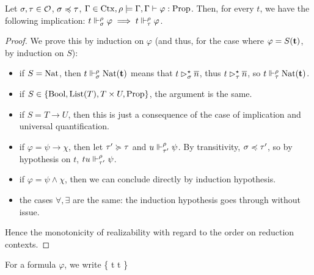 \documentclass[a4paper,UKenglish,cleveref, autoref, thm-restate]{lipics-v2021}
\begin{document}
\begin{proposition}\label{prop.monotonicity}
  Let $\sigma, \tau \in \mathcal O$, $\sigma \preccurlyeq \tau$, $\Gamma \in \mathrm{Ctx}, \rho \models \Gamma, \Gamma \vdash \varphi : \mathrm{Prop}$. Then, for every $t$, we have the following implication: $t \Vdash_{\sigma}^{\rho} \varphi \implies t \Vdash_{\tau}^{\rho} \varphi$.
\end{proposition}
\begin{proof}
We prove this by induction on $\varphi$ (and thus, for the case where $\varphi = S(\mathbf{t})$, by induction on $S$):
  \begin{itemize}
  \item if $S = \mathrm{Nat}$, then $t \Vdash_{\sigma}^{\rho} \mathrm{Nat}(\mathbf{t})$ means that $t \rhd^{\star}_{\sigma} \overline n$, thus $t \rhd^{\star}_{\tau} \overline n$, so $t \Vdash_{\tau}^{\rho} \mathrm{Nat}(\mathbf{t})$.
  \item if $S \in \{\mathrm{Bool}, \mathrm{List}(T), T \times U, \mathrm{Prop}\}$, the argument is the same.
  \item if $S = T \to U$, then this is just a consequence of the case of implication and universal quantification.
  \item if $\varphi = \psi \to \chi$, then let $\tau' \succcurlyeq\tau$ and $u \Vdash_{\tau'}^{\rho} \psi$. By transitivity, $\sigma \preccurlyeq \tau'$, so by hypothesis on $t$, $tu \Vdash_{\tau'}^{\rho} \psi$.
  \item if $\varphi = \psi \land \chi$, then we can conclude directly by induction hypothesis.
  \item the cases $\forall, \exists$ are the same: the induction hypothesis goes through without issue.
  \end{itemize}
  Hence the monotonicity of realizability with regard to the order on reduction contexts.
\end{proof}
\begin{notation}
  For a formula $\varphi$, we write
   {\realF{\varphi}  \{ t \in \Lambda \mid t \realU \varphi\}}
\end{notation}
\end{document}
